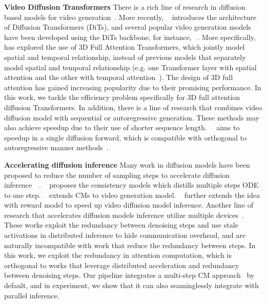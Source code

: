 \textbf{Video Diffusion Transformers} There is a rich line of research in diffusion based models for video generation~\citep{ho2022video, he2022latent, VideoFusion, wang2023lavie, ge2023preserve, chen2024videocrafter2, guo2023sparsectrl, guo2023animatediff}. More recently, ~\citet{peebles2023scalable} introduces the architecture of Diffusion Transformers (DiTs), and several popular video generation models have been developed using the DiTs backbone, for instance, ~\citet{ma2024latte, opensora, pku_yuan_lab_and_tuzhan_ai_etc_2024_10948109, yang2024cogvideox}. More specifically, ~\citet{ pku_yuan_lab_and_tuzhan_ai_etc_2024_10948109, yang2024cogvideox} has explored the use of 3D Full Attention Transformers, which jointly model spatial and temporal relationship, instead of previous models that separately model spatial and temporal relationship (e.g. one Transformer layer with spatial attention and the other with temporal attention~\citep{opensora, ma2024latte}). The design of 3D full attention has gained increasing popularity due to their promising performance. In this work, we tackle the efficiency problem specifically for 3D full attention diffusion Transformers. In addition, there is a line of research that combines video diffusion model with sequential or autoregressive generation. These methods may also achieve speedup due to their use of shorter sequence length. ~\methodname~aims to speedup in a single diffusion forward, which is compatible with orthogonal to autoregressive manner methods~\citep{henschel2024streamingt2v, xiang2024pandora, chen2024diffusion, valevski2024diffusion}. 

\textbf{Accelerating diffusion inference} 
Many work in diffusion models have been proposed to reduce the number of sampling steps to accelerate diffusion inference~\citep{song2020denoising, lu2022dpm, lu2022dpm++}~\citep{liu2024scott}.  ~\citet{song2023consistency} proposes the consistency models which distills multiple steps ODE to one step. ~\citet{wang2023videolcm} extends CMs to video generation model. ~\citet{li2024t2v} further extends the idea with reward model to speed up video diffusion model inference. 
Another line of research that accelerates diffusion models inference utilize multiple devices~\citep{li2024distrifusion, wang2024pipefusion, chen2024asyncdiff, zhao2024real}. These works exploit the redundancy between denoising steps and use stale activations in distributed inference to hide communication overhead, and are naturally incompatible with work that reduce the redundancy between steps. In this work, we exploit the redundancy in attention computation, which is orthogonal to works that leverage distributed acceleration and redundancy between denoising steps. Our pipeline integrates a multi-step CM approach~\citep{xie2024mlcm} by default, and in experiment, we show that it can also seaminglessly integrate with parallel inference.

